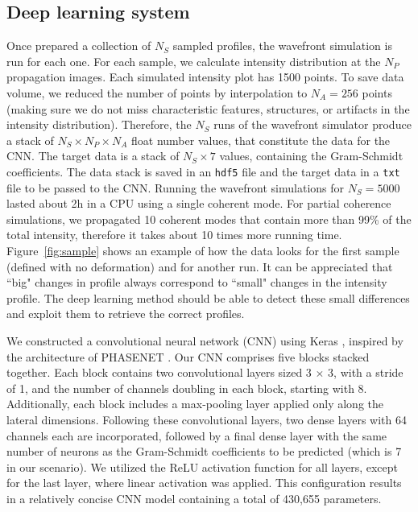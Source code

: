 \documentclass{iucr}
\newcommand{\inred}[1]{{\color{black}#1}}
\begin{document}
\subsection{Deep learning system}
Once prepared a collection of $N_S$ sampled profiles, the wavefront simulation is run for each one. For each sample,  we calculate intensity distribution at the $N_P$ propagation images. Each simulated intensity plot has 1500 points. To save data volume, we reduced the number of points by interpolation to $N_A=256$ points (making sure we do not miss characteristic features, structures, or artifacts in the intensity distribution). Therefore, the $N_S$ runs of the wavefront simulator produce a stack of $N_S \times N_P \times N_A$ float number values, that constitute the data for the CNN. The target data is a stack of $N_S \times 7$ values, containing the Gram-Schmidt coefficients. The data stack is saved in an \texttt{hdf5} file and the target data in a \texttt{txt} file to be passed to the CNN. Running the wavefront simulations for $N_S=5000$ lasted about 2h in a CPU using a single coherent mode. For partial coherence simulations, we propagated 10 coherent modes that contain more than 99\% of the total intensity, therefore it takes about 10 times more running time. Figure~\ref{fig:sample} shows an example of how the data looks for the first sample (defined with no deformation) and for another run. \inred{It can be appreciated that ``big" changes in profile always correspond to ``small" changes in the intensity profile. The deep learning method should be able to detect these small differences and exploit them to retrieve the correct profiles. }




\inred{
We constructed a convolutional neural network (CNN) using Keras \cite{keras}, inspired by the architecture of PHASENET \cite{Saha2020}. Our CNN comprises five blocks stacked together. Each block contains two convolutional layers sized 3 $\times$ 3, with a stride of 1, and the number of channels doubling in each block, starting with 8. Additionally, each block includes a max-pooling layer applied only along the lateral dimensions. Following these convolutional layers, two dense layers with 64 channels each are incorporated, followed by a final dense layer with the same number of neurons as the Gram-Schmidt coefficients to be predicted (which is 7 in our scenario). We utilized the ReLU activation function for all layers, except for the last layer, where linear activation was applied. This configuration results in a relatively concise CNN model containing a total of 430,655 parameters.
}
\end{document}
